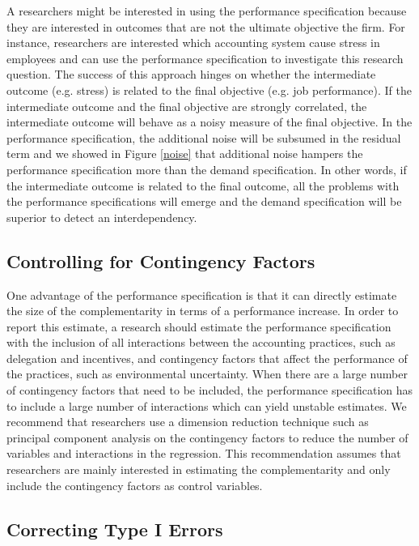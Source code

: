 \documentclass[12pt]{article}
\begin{document}
A researchers might be interested in using the performance specification because they are interested in outcomes that are not the ultimate objective the firm. For instance, researchers are interested which accounting system cause stress in employees \citep{shields_design_2000} and can use the performance specification to investigate this research question. The success of this approach hinges on whether the intermediate outcome (e.g. stress) is related to the final objective (e.g. job performance). If the intermediate outcome and the final objective are strongly correlated, the intermediate outcome will behave as a noisy measure of the final objective. In the performance specification, the additional noise will be subsumed in the residual term and we showed in Figure \ref{noise} that additional noise hampers the performance specification more than the demand specification. In other words, if the intermediate outcome is related to the final outcome, all the problems with the performance specifications will emerge and the demand specification will be superior to detect an interdependency.

\subsection{Controlling for Contingency Factors}

One advantage of the performance specification is that it can directly estimate the size of the complementarity in terms of a performance increase. In order to report this estimate, a research should estimate the performance specification with the inclusion of all interactions between the accounting practices, such as delegation and incentives, and contingency factors that affect the performance of the practices, such as environmental uncertainty. When there are a large number of contingency factors that need to be included, the performance specification has to include a large number of interactions which can yield unstable estimates. We recommend that researchers use a dimension reduction technique such as principal component analysis on the contingency factors to reduce the number of variables and interactions in the regression. This recommendation assumes that researchers are mainly interested in estimating the complementarity and only include the contingency factors as control variables.

\subsection{Correcting Type I Errors}
\end{document}

